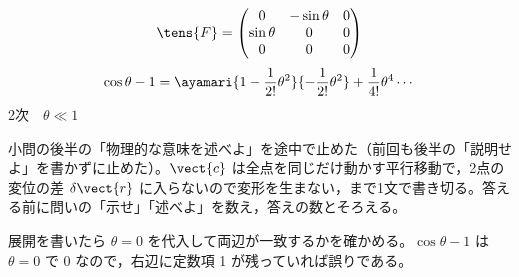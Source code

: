 \[ \tens{F}=\begin{pmatrix}0&-\sin\theta&0\\\sin\theta&0&0\\0&0&0\end{pmatrix} \]
\[ \cos\theta-1=\ayamari{1-\frac{1}{2!}\theta^{2}}{-\frac{1}{2!}\theta^{2}}+\frac{1}{4!}\theta^{4}\cdots \]
2次　$\theta\ll1$
\item {} 小問の後半の「物理的な意味を述べよ」を途中で止めた（前回も後半の「説明せよ」を書かずに止めた）。$\vect{c}$ は全点を同じだけ動かす平行移動で，2点の変位の差 $\delta\vect{r}$ に入らないので変形を生まない，まで1文で書き切る。答える前に問いの「示せ」「述べよ」を数え，答えの数とそろえる。
\item 展開を書いたら $\theta=0$ を代入して両辺が一致するかを確かめる。$\cos\theta-1$ は $\theta=0$ で 0 なので，右辺に定数項 1 が残っていれば誤りである。
